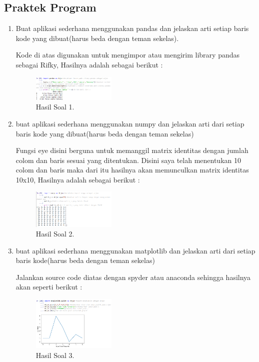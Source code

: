 \subsection{Praktek Program}
\begin{enumerate}
	\item Buat aplikasi sederhana menggunakan pandas dan jelaskan arti setiap baris kode yang dibuat(harus beda dengan teman sekelas).
	\hfill\break
	
	Kode di atas digunakan untuk mengimpor atau mengirim library pandas sebagai Rifky, Hasilnya adalah sebagai berikut :
	\begin{figure}[H]
	\centering
		\includegraphics[width=4cm]{figures/1174017/3/teori/hasilsoal1.PNG}
		\caption{Hasil Soal 1.}
	\end{figure}

	\item buat aplikasi sederhana menggunakan numpy dan jelaskan arti dari setiap baris kode yang dibuat(harus beda dengan teman sekelas)
	\hfill\break
	
	Fungsi eye disini berguna untuk memanggil matrix identitas dengan jumlah colom dan baris sesuai yang ditentukan. Disini saya telah menentukan 10 colom dan baris maka dari itu hasilnya akan memunculkan matrix identitas 10x10, Hasilnya adalah sebagai berikut :
	\begin{figure}[H]
	\centering
	\includegraphics[width=4cm]{figures/1174017/3/teori/hasilsoal2.PNG}
		\caption{Hasil Soal 2.}
	\end{figure}
	
	\item buat aplikasi sederhana menggunakan matplotlib dan jelaskan arti dari setiap baris kode(harus beda dengan teman sekelas)
	\hfill\break
	
	Jalankan source code diatas dengan spyder atau anaconda sehingga hasilnya akan seperti berikut : 

	\begin{figure}[H]
	\centering
		\includegraphics[width=4cm]{figures/1174017/3/teori/hasilsoal3.PNG}
		\caption{Hasil Soal 3.}
	\end{figure}


\end{enumerate}
